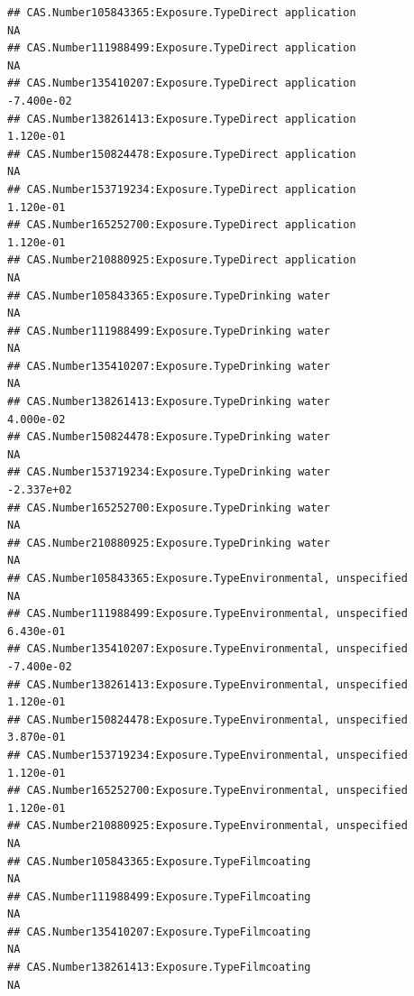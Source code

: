 \documentclass[
  12pt,
]{article}
\begin{document}
\begin{verbatim}
## CAS.Number105843365:Exposure.TypeDirect application                                     NA
## CAS.Number111988499:Exposure.TypeDirect application                                     NA
## CAS.Number135410207:Exposure.TypeDirect application                             -7.400e-02
## CAS.Number138261413:Exposure.TypeDirect application                              1.120e-01
## CAS.Number150824478:Exposure.TypeDirect application                                     NA
## CAS.Number153719234:Exposure.TypeDirect application                              1.120e-01
## CAS.Number165252700:Exposure.TypeDirect application                              1.120e-01
## CAS.Number210880925:Exposure.TypeDirect application                                     NA
## CAS.Number105843365:Exposure.TypeDrinking water                                         NA
## CAS.Number111988499:Exposure.TypeDrinking water                                         NA
## CAS.Number135410207:Exposure.TypeDrinking water                                         NA
## CAS.Number138261413:Exposure.TypeDrinking water                                  4.000e-02
## CAS.Number150824478:Exposure.TypeDrinking water                                         NA
## CAS.Number153719234:Exposure.TypeDrinking water                                 -2.337e+02
## CAS.Number165252700:Exposure.TypeDrinking water                                         NA
## CAS.Number210880925:Exposure.TypeDrinking water                                         NA
## CAS.Number105843365:Exposure.TypeEnvironmental, unspecified                             NA
## CAS.Number111988499:Exposure.TypeEnvironmental, unspecified                      6.430e-01
## CAS.Number135410207:Exposure.TypeEnvironmental, unspecified                     -7.400e-02
## CAS.Number138261413:Exposure.TypeEnvironmental, unspecified                      1.120e-01
## CAS.Number150824478:Exposure.TypeEnvironmental, unspecified                      3.870e-01
## CAS.Number153719234:Exposure.TypeEnvironmental, unspecified                      1.120e-01
## CAS.Number165252700:Exposure.TypeEnvironmental, unspecified                      1.120e-01
## CAS.Number210880925:Exposure.TypeEnvironmental, unspecified                             NA
## CAS.Number105843365:Exposure.TypeFilmcoating                                            NA
## CAS.Number111988499:Exposure.TypeFilmcoating                                            NA
## CAS.Number135410207:Exposure.TypeFilmcoating                                            NA
## CAS.Number138261413:Exposure.TypeFilmcoating                                            NA

\end{verbatim}
\end{document}
